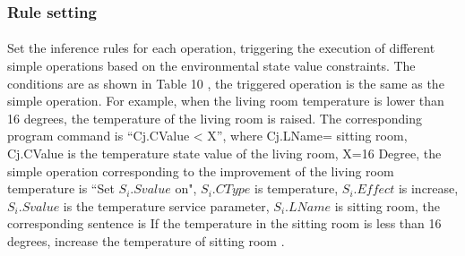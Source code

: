 

\subsubsection{Rule setting}
\paragraph{}
Set the inference rules for each operation, triggering the execution of different simple operations based on the environmental state value constraints. The conditions are as shown in Table 10 , the triggered operation is the same as the simple operation. For example, when the living room temperature is lower than 16 degrees, the temperature of the living room is raised. The corresponding program command is “Cj.CValue < X”, where Cj.LName= sitting room, Cj.CValue is the temperature state value of the living room, X=16 Degree, the simple operation corresponding to the improvement of the living room temperature is ``Set $S_{i}.Svalue$ on", $S_{i}.CType$ is temperature, $S_{i}.Effect$ is increase, $S_{i}.Svalue$ is the temperature service parameter, $S_{i}.LName$ is sitting room, the corresponding sentence is If the temperature in the sitting room is less than 16 degrees, increase the temperature of sitting room .

